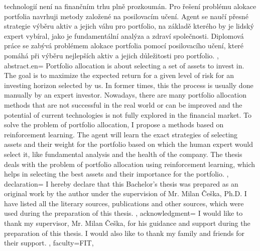 {{        technologií není na finančním trhu plně prozkoumán.
        Pro řešení problému alokace portfolia navrhuji metody
        založené na posilovacím učení.
        Agent se naučí přesné strategie výběru aktiv a jejich váhu pro portfolio,
        na základě kterého by je lidský expert vybíral,
        jako je fundamentální analýza a zdraví společnosti.
        Diplomová práce se zabývá problémem alokace portfolia
        pomocí posilovacího učení, které pomáhá při výběru nejlepších aktiv
        a jejich důležitosti pro portfolio.
    }, %
    abstract.en={
        Portfolio allocation is about selecting a set of assets to invest in.
        The goal is to maximize the expected return for
        a given level of risk for an investing horizon selected by us.
        In former times, this the process is usually done manually
        by an expert investor.
        Nowadays, there are many portfolio allocation methods that are not
        successful in the real world or can be improved and the
        potential of current technologies is not fully explored
        in the financial market.
        To solve the problem of portfolio allocation, I propose a methods
        based on reinforcement learning.
        The agent will learn the exact strategies of
        selecting assets and their weight for the portfolio based on
        which the human expert would select it,
        like fundamental analysis and the health of the company.
        The thesis deals with the problem of portfolio allocation
        using reinforcement learning, which helps in selecting
        the best assets and their importance for the portfolio.
    }, %
    declaration={
        I hereby declare that this Bachelor's thesis was prepared as an
        original work by the author under the supervision
        of Mr. Milan Češka, Ph.D. %
        I have listed all the literary sources, publications and other sources,
        which were used during the preparation of this thesis.
    },
%
    acknowledgment={
        I would like to thank my supervisor, Mr. Milan Češka, for his guidance
        and support during the preparation of this thesis.
        I would also like to thank my family and friends for their support.
    },
%
%        
%
    faculty={FIT}, %
}
